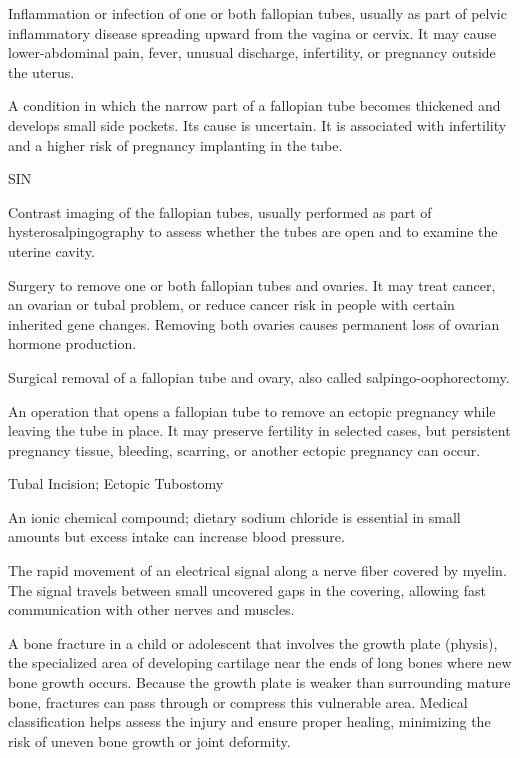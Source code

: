  Inflammation or infection of one or both fallopian tubes, usually as part of pelvic inflammatory disease spreading upward from the vagina or cervix. It may cause lower-abdominal pain, fever, unusual discharge, infertility, or pregnancy outside the uterus.

 A condition in which the narrow part of a fallopian tube becomes thickened and develops small side pockets. Its cause is uncertain. It is associated with infertility and a higher risk of pregnancy implanting in the tube.

\synonyms
SIN

 Contrast imaging of the fallopian tubes, usually performed as part of hysterosalpingography to assess whether the tubes are open and to examine the uterine cavity.

 Surgery to remove one or both fallopian tubes and ovaries. It may treat cancer, an ovarian or tubal problem, or reduce cancer risk in people with certain inherited gene changes. Removing both ovaries causes permanent loss of ovarian hormone production.

 Surgical removal of a fallopian tube and ovary, also called salpingo-oophorectomy.

 An operation that opens a fallopian tube to remove an ectopic pregnancy while leaving the tube in place. It may preserve fertility in selected cases, but persistent pregnancy tissue, bleeding, scarring, or another ectopic pregnancy can occur.

\synonyms
Tubal Incision; Ectopic Tubostomy

 An ionic chemical compound; dietary sodium chloride is essential in small amounts but excess intake can increase blood pressure.

 The rapid movement of an electrical signal along a nerve fiber covered by myelin. The signal travels between small uncovered gaps in the covering, allowing fast communication with other nerves and muscles.

 A bone fracture in a child or adolescent that involves the growth plate (physis), the specialized area of developing cartilage near the ends of long bones where new bone growth occurs. Because the growth plate is weaker than surrounding mature bone, fractures can pass through or compress this vulnerable area. Medical classification helps assess the injury and ensure proper healing, minimizing the risk of uneven bone growth or joint deformity.

